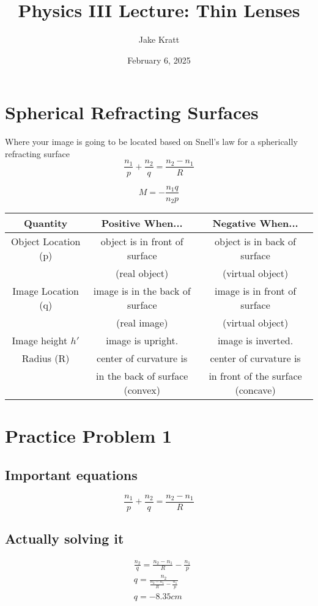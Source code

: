 \documentclass[12pt, letterpaper]{article}
\title{Physics III Lecture: Thin Lenses}
\author{Jake Kratt}
\date{February 6, 2025}
\begin{document}
\maketitle
\section*{Spherical Refracting Surfaces}
Where your image is going to be located based on Snell's law for a spherically refracting surface
\[\frac{n_{1}}{p}+\frac{n_{2}}{q}=\frac{n_{2}-n_{1}}{R}\]

\[M = -\frac{n_{1}q}{n_{2}p}\]

\begin{tabular}{ |c|c|c| }
\hline
Quantity & Positive When... & Negative When... \\
\hline
Object Location (p) & object is in front of surface & object is in back of surface \\
& (real object) & (virtual object) \\
\hline
Image Location (q) & image is in the back of surface & image is in front of surface  \\
& (real image) & (virtual object) \\
\hline
Image height $h'$ & image is upright. & image is inverted. \\
\hline
Radius (R) & center of curvature is  & center of curvature is  \\
& in the back of surface (convex) & in front of the surface (concave) \\
\hline
    
\end{tabular}

\section*{Practice Problem 1}

\subsection*{Important equations}
\[\frac{n_{1}}{p}+\frac{n_{2}}{q}=\frac{n_{2}-n_{1}}{R}\]

\subsection*{Actually solving it}

\begin{align*}
    & \frac{n_{2}}{q} = \frac{n_{2} - n_{1}}{R} - \frac{n_{1}}{p} \\
    & q = \frac{n_{2}}{\frac{n_{2} - n_{1}}{R} - \frac{n_{1}}{p}} \\
    & q = -8.35cm
\end{align*}
\end{document}
